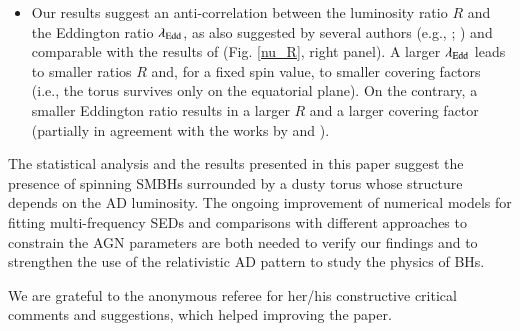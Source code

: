 \documentclass[]{aa}
\begin{document}
\begin{itemize}
	\item Our results suggest an anti-correlation between the luminosity ratio $R$ and the Eddington ratio $\lambda_{\rm Edd}$, as also suggested by several authors (e.g., \citealt{Ezhi}; \citealt{Buch}) and comparable with the results of \citet{Ricci} (Fig. \ref{nu_R}, right panel). A larger $\lambda_{\rm Edd}$ leads to smaller ratios $R$ and, for a fixed spin value, to smaller covering factors (i.e., the torus survives only on the equatorial plane). On the contrary, a smaller Eddington ratio results in a larger $R$ and a larger covering factor (partially in agreement with the works by \citealt{Ishi} and \citealt{Ishi20}).
\end{itemize}

The statistical analysis and the results presented in this paper suggest the presence of spinning SMBHs surrounded by a dusty torus whose structure depends on the AD luminosity. The ongoing improvement of numerical models for fitting multi-frequency SEDs and comparisons with different approaches to constrain the AGN parameters are both needed to verify our findings and to strengthen the use of the relativistic AD pattern to study the physics of BHs.\\

















\begin{acknowledgements}
We are grateful to the anonymous referee for her/his constructive critical comments and suggestions, which helped improving the paper.
\end{acknowledgements}



\medskip
\let\itshape\upshape
\end{document}
